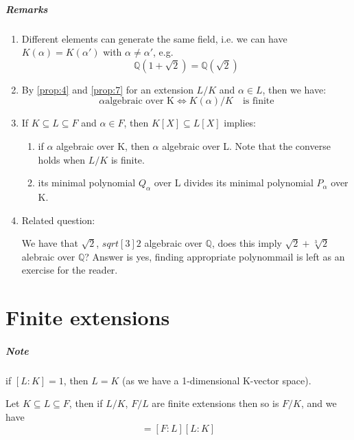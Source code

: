 \subparagraph{Remarks}
\begin{enumerate}
\item Different elements can generate the same field, i.e. we can have $K(\alpha) = K(\alpha')$ with $\alpha \neq \alpha'$, e.g.
  \begin{equation*}
    \mathbb{Q}(1+\sqrt{2}) = \mathbb{Q}(\sqrt{2})
  \end{equation*}

\item By \ref{prop:4} and \ref{prop:7} for an extension $L/K$ and $\alpha \in L$, then we have:
  \begin{equation*}
    \alpha \text{algebraic over K} \Leftrightarrow K(\alpha)/K \quad \text{is finite} 
  \end{equation*}

\item If $K \subseteq L \subseteq F$ and $\alpha \in F$, then $K[X] \subseteq L[X]$ implies:
  \begin{enumerate}
  \item if $\alpha$ algebraic over K, then $\alpha$ algebraic over L. Note that the converse holds when $L/K$ is finite.
  \item its minimal polynomial $Q_\alpha$ over L divides its minimal polynomial $P_\alpha$ over K.
  \end{enumerate} 

\item Related question:

We have that $\sqrt{2}$, $sqrt[3]{2}$ algebraic over $\mathbb{Q}$, does this imply $\sqrt{2} + \sqrt[3]{2}$ alebraic over $\mathbb{Q}$? Answer is yes, finding appropriate polynommail is left as an exercise for the reader.
\end{enumerate}

\section{Finite extensions}
\subparagraph{Note} if $[L : K] = 1$, then $L = K$ (as we have a 1-dimensional K-vector space).

\begin{proposition}\label{prop:8}
  Let $K \subseteq L \subseteq F$, then if $L/K$, $F/L$ are finite extensions then so is $F/K$, and we have
  \begin{equation*}
    [F : K] = [F:L][L:K]
  \end{equation*}
\end{proposition}

